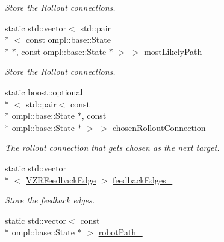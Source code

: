 \begin{DoxyCompactItemize}
\begin{DoxyCompactList}\small\item\em Store the Rollout connections. \end{DoxyCompactList}\item 
\hypertarget{class_visualizer_a67cb011e12b48a8aa95249324fd9ed87}{static std\-::vector$<$ std\-::pair\\*
$<$ const ompl\-::base\-::\-State \\*
$\ast$, const ompl\-::base\-::\-State $\ast$ $>$ $>$ \hyperlink{class_visualizer_a67cb011e12b48a8aa95249324fd9ed87}{most\-Likely\-Path\-\_\-}}\label{class_visualizer_a67cb011e12b48a8aa95249324fd9ed87}

\begin{DoxyCompactList}\small\item\em Store the Rollout connections. \end{DoxyCompactList}\item 
\hypertarget{class_visualizer_a241e08e6835a4655fb32b0171dcb9d53}{static boost\-::optional\\*
$<$ std\-::pair$<$ const \\*
ompl\-::base\-::\-State $\ast$, const \\*
ompl\-::base\-::\-State $\ast$ $>$ $>$ \hyperlink{class_visualizer_a241e08e6835a4655fb32b0171dcb9d53}{chosen\-Rollout\-Connection\-\_\-}}\label{class_visualizer_a241e08e6835a4655fb32b0171dcb9d53}

\begin{DoxyCompactList}\small\item\em The rollout connection that gets chosen as the next target. \end{DoxyCompactList}\item 
\hypertarget{class_visualizer_a506f4480f1c47d9105283ca07b600d64}{static std\-::vector\\*
$<$ \hyperlink{struct_visualizer_1_1_v_z_r_feedback_edge}{V\-Z\-R\-Feedback\-Edge} $>$ \hyperlink{class_visualizer_a506f4480f1c47d9105283ca07b600d64}{feedback\-Edges\-\_\-}}\label{class_visualizer_a506f4480f1c47d9105283ca07b600d64}

\begin{DoxyCompactList}\small\item\em Store the feedback edges. \end{DoxyCompactList}\item 
\hypertarget{class_visualizer_a887ebf260abf93bf1a88560faf7eccb2}{static std\-::vector$<$ const \\*
ompl\-::base\-::\-State $\ast$ $>$ \hyperlink{class_visualizer_a887ebf260abf93bf1a88560faf7eccb2}{robot\-Path\-\_\-}}\label{class_visualizer_a887ebf260abf93bf1a88560faf7eccb2}


\end{DoxyCompactItemize}

